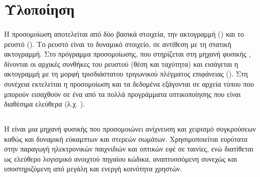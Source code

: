 \section{Υλοποίηση}

\paragraph{} Η προσομοίωση αποτελείται από δύο βασικά στοιχεία, την ακτογραμμή
() και το ρευστό (). Το ρευστό είναι το δυναμικό στοιχείο, σε
αντίθεση με τη στατική ακτογραμμή. Στο πρόγραμμα προσομοίωσης, που στηρίζεται στη μηχανή
φυσικής , δίνονται οι αρχικές συνθήκες του ρευστού (θέση και ταχύτητα) και
εισάγεται η ακτογραμμή με τη μορφή τρισδιάστατου τριγωνικού πλέγματος επιφάνειας
(). Στη συνέχεια εκτελείται η προσομοίωση και τα δεδομένα
εξάγονται σε αρχεία τύπου  που μπορούν εισαχθούν σε ένα από τα πολλά προγράμματα
οπτικοποίησης που είναι διαθέσιμα ελεύθερα (λ.χ. ).

\subsection{\texorpdfstring{}{}}
\paragraph{} Η  είναι μια μηχανή φυσικής που προσομοιώνει ανίχνευση και
χειρισμό συγκρούσεων καθώς και δυναμική εύκαμπτων και στερεών σωμάτων. Χρησιμοποιείται
ευρύτατα στην παραγωγή ηλεκτρονικών παιχνιδιών και οπτικών εφέ σε ταινίες, ενώ διατίθεται
ως ελεύθερο λογισμικό ανοιχτού πηγαίου κώδικα, αναπτυσσόμενη συνεχώς και υποστηριζόμενη
από μεγάλη και ενεργή κοινότητα χρηστών.

